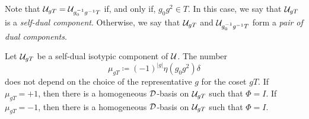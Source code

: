 Note that $\mathcal U_{g T} = \mathcal U_{g_0^{-1} g^{-1} T}$ if, and only if, $g_0 g^2 \in T$. 
In this case, we say that $\mathcal U_{gT}$ is a \emph{self-dual component}. 
Otherwise, we say that $\mathcal U_{gT}$ and $\mathcal U_{g_0^{-1} g^{-1} T}$ form a \emph{pair of dual components}.

\begin{lemma}\label{lemma:self-dual-components}
    Let $\mathcal U_{gT}$ be a self-dual isotypic component of $\mathcal U$. 
    The number 
    \begin{equation}
        \mu_{gT} \coloneqq (-1)^{|g|} \eta(g_0 g^2)\delta
    \end{equation}
    does not depend on the choice of the representative $g$ for the coset $gT$. 
    If $\mu_{gT} = +1$, then there is a homogeneous $\mathcal{D}$-basis on $\mathcal U_{gT}$ such that $\Phi = I$. 
    If $\mu_{gT} = -1$, then there is a homogeneous $\mathcal{D}$-basis on $\mathcal U_{gT}$ such that $\Phi = I$. 
\end{lemma}

